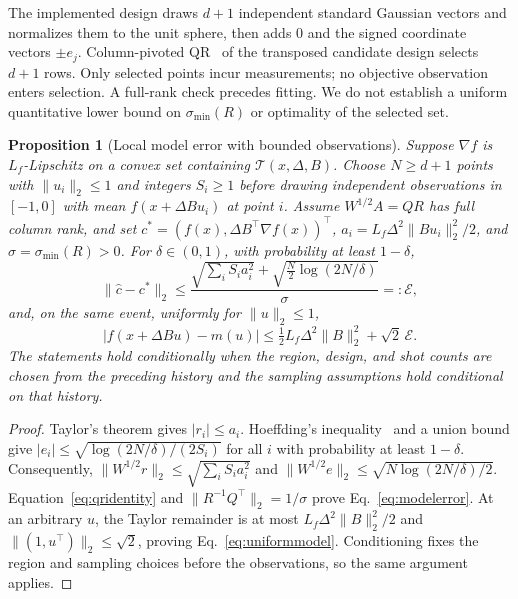 \documentclass[11pt]{article}
\newcommand{\norm}[1]{\lVert #1\rVert}
\newtheorem{proposition}[theorem]{Proposition}
\begin{document}
The implemented design draws $d+1$ independent standard Gaussian vectors
and normalizes them to the unit sphere, then adds $0$ and the signed
coordinate vectors $\pm e_j$. Column-pivoted QR~\cite{businger1965} of the
transposed candidate design selects $d+1$ rows. Only selected points incur
measurements; no objective observation enters selection. A full-rank check
precedes fitting. We do not establish a uniform quantitative lower bound on
$\sigma_{\min}(R)$ or optimality of the selected set.

\begin{proposition}[Local model error with bounded observations]
\label{prop:model}
Suppose $\nabla f$ is $L_f$-Lipschitz on a convex set containing
$\mathcal T(x,\Delta,B)$. Choose $N\ge d+1$ points with $\norm{u_i}_2\le1$
and integers $S_i\ge1$ before drawing independent observations in
$[-1,0]$ with mean $f(x+\Delta Bu_i)$ at point $i$.
Assume $W^{1/2}A=QR$ has full column rank, and set
$c^*=(f(x),\Delta B^\top\nabla f(x))^\top$,
$a_i=L_f\Delta^2\norm{Bu_i}_2^2/2$, and $\sigma=\sigma_{\min}(R)>0$.
For $\delta\in(0,1)$, with probability at least $1-\delta$,
\begin{equation}
 \norm{\widehat c-c^*}_2\le
 \frac{\sqrt{\sum_i S_i a_i^2}+\sqrt{\tfrac N2\log(2N/\delta)}}{\sigma}
 =:\mathcal E,
 \label{eq:modelerror}
\end{equation}
and, on the same event, uniformly for $\norm u_2\le1$,
\begin{equation}
 |f(x+\Delta Bu)-m(u)|
 \le\tfrac12L_f\Delta^2\norm B_2^2+\sqrt2\,\mathcal E.
 \label{eq:uniformmodel}
\end{equation}
The statements hold conditionally when the region, design, and shot counts
are chosen from the preceding history and the sampling assumptions hold
conditional on that history.
\end{proposition}
\begin{proof}
Taylor's theorem gives $|r_i|\le a_i$. Hoeffding's inequality~\cite{hoeffding1963}
and a union bound give $|e_i|\le\sqrt{\log(2N/\delta)/(2S_i)}$ for all
$i$ with probability at least $1-\delta$. Consequently,
$\norm{W^{1/2}r}_2\le\sqrt{\sum_iS_i a_i^2}$ and
$\norm{W^{1/2}e}_2\le\sqrt{N\log(2N/\delta)/2}$.
Equation~\eqref{eq:qridentity} and
$\norm{R^{-1}Q^\top}_2=1/\sigma$ prove Eq.~\eqref{eq:modelerror}.
At an arbitrary $u$, the Taylor remainder is at most
$L_f\Delta^2\norm B_2^2/2$ and $\norm{(1,u^\top)}_2\le\sqrt2$, proving
Eq.~\eqref{eq:uniformmodel}. Conditioning fixes the region and sampling
choices before the observations, so the same argument applies.
\end{proof}
\end{document}

